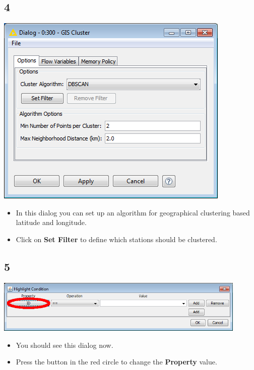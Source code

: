 \documentclass{beamer}
\begin{document}
\subsection{4}
\begin{frame}
	\begin{center}
  		\includegraphics[height=0.6\textheight]{4.png}
	\end{center}
	\begin{itemize}
		\item In this dialog you can set up an algorithm for geographical clustering based latitude and longitude.
		\item Click on \textbf{Set Filter} to define which stations should be clustered.
	\end{itemize}
\end{frame}

\subsection{5}
\begin{frame}
	\begin{center}
  		\includegraphics[width=0.9\textwidth]{5.png}
	\end{center}
	\begin{itemize}
		\item You should see this dialog now.
		\item Press the button in the red circle to change the \textbf{Property} value.
	\end{itemize}
\end{frame}
\end{document}
